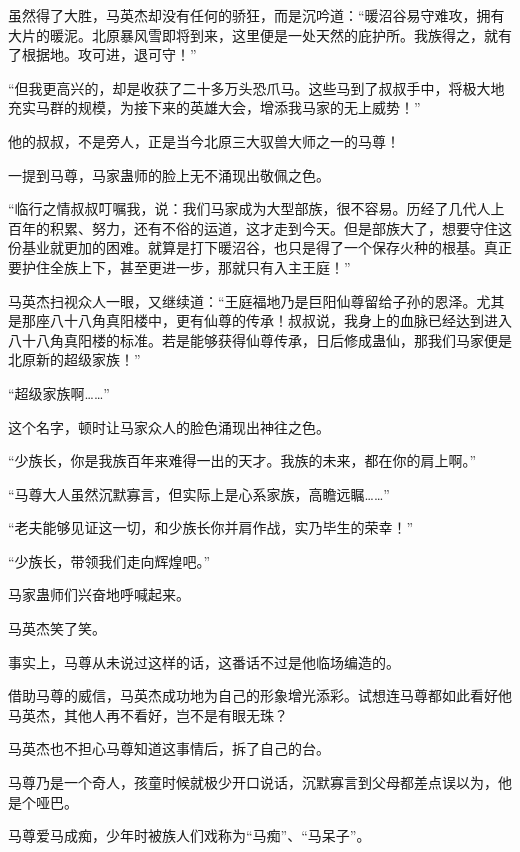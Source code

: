 
\begin{this_body}

虽然得了大胜，马英杰却没有任何的骄狂，而是沉吟道：“暖沼谷易守难攻，拥有大片的暖泥。北原暴风雪即将到来，这里便是一处天然的庇护所。我族得之，就有了根据地。攻可进，退可守！”

“但我更高兴的，却是收获了二十多万头恐爪马。这些马到了叔叔手中，将极大地充实马群的规模，为接下来的英雄大会，增添我马家的无上威势！”

他的叔叔，不是旁人，正是当今北原三大驭兽大师之一的马尊！

一提到马尊，马家蛊师的脸上无不涌现出敬佩之色。

“临行之情叔叔叮嘱我，说：我们马家成为大型部族，很不容易。历经了几代人上百年的积累、努力，还有不俗的运道，这才走到今天。但是部族大了，想要守住这份基业就更加的困难。就算是打下暖沼谷，也只是得了一个保存火种的根基。真正要护住全族上下，甚至更进一步，那就只有入主王庭！”

马英杰扫视众人一眼，又继续道：“王庭福地乃是巨阳仙尊留给子孙的恩泽。尤其是那座八十八角真阳楼中，更有仙尊的传承！叔叔说，我身上的血脉已经达到进入八十八角真阳楼的标准。若是能够获得仙尊传承，日后修成蛊仙，那我们马家便是北原新的超级家族！”

“超级家族啊……”

这个名字，顿时让马家众人的脸色涌现出神往之色。

“少族长，你是我族百年来难得一出的天才。我族的未来，都在你的肩上啊。”

“马尊大人虽然沉默寡言，但实际上是心系家族，高瞻远瞩……”

“老夫能够见证这一切，和少族长你并肩作战，实乃毕生的荣幸！”

“少族长，带领我们走向辉煌吧。”

马家蛊师们兴奋地呼喊起来。

马英杰笑了笑。

事实上，马尊从未说过这样的话，这番话不过是他临场编造的。

借助马尊的威信，马英杰成功地为自己的形象增光添彩。试想连马尊都如此看好他马英杰，其他人再不看好，岂不是有眼无珠？

马英杰也不担心马尊知道这事情后，拆了自己的台。

马尊乃是一个奇人，孩童时候就极少开口说话，沉默寡言到父母都差点误以为，他是个哑巴。

马尊爱马成痴，少年时被族人们戏称为“马痴”、“马呆子”。


\end{this_body}

